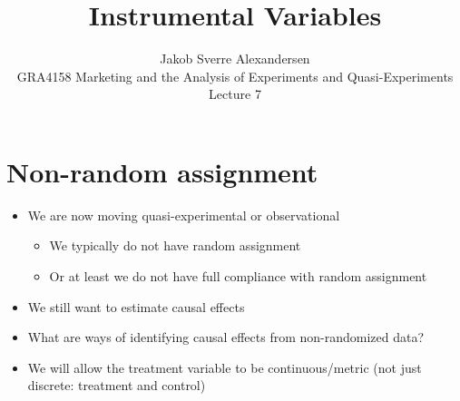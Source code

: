 \documentclass[10pt]{article}
\begin{document}
 
\title{Instrumental Variables}
\author{Jakob Sverre Alexandersen\\
GRA4158 Marketing and the Analysis of Experiments and Quasi-Experiments\\
Lecture 7}
\maketitle

\tableofcontents
\newpage

\section{Non-random assignment}
\begin{itemize}
    \item We are now moving quasi-experimental or observational 
    \begin{itemize}
        \item We typically do not have random assignment 
        \item Or at least we do not have full compliance with random assignment
    \end{itemize}
    \item We still want to estimate causal effects 
    \item What are ways of identifying causal effects from non-randomized data?
    \item We will allow the treatment variable to be continuous/metric (not just discrete: treatment and control)
\end{itemize}
\end{document}
